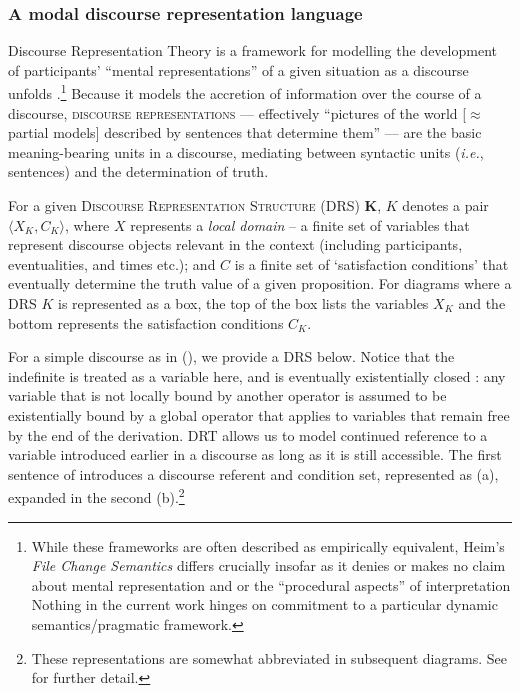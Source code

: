 \subsubsection{A modal discourse representation language}\label{sec-MDRL}

Discourse Representation Theory \citetext{originating simultaneously with \citealt{Kamp1981} and the related system of \citealt{Heim}} is a framework for modelling the development of participants' ``mental representations'' of a given situation as a discourse unfolds \citep[see][]{Geurts}.\footnote{While these frameworks are often described as empirically equivalent, Heim's \textit{File Change Semantics} differs crucially insofar as it denies or makes no claim about mental representation and or the ``procedural aspects'' of interpretation \citetext{\citealp[102]{Kamp1988}, this property also addressed in \citealp[\S~6]{Geurts}.} Nothing in the current work hinges on commitment to a particular dynamic semantics/pragmatic framework.} 
Because it models the accretion of information over the course of a discourse, \textsc{discourse representations} --- effectively ``pictures of the world [$ \approx $ partial models] described by sentences that determine them'' --- are the basic meaning-bearing units in a discourse, mediating between syntactic units (\textit{i.e.}, sentences) and the determination of truth.


For a given \textsc{Discourse Representation Structure} (DRS) $ \boldsymbol K $, $ K $ denotes a pair $ \langle X_K,C_K\rangle $, where $ X $ represents a \textit{local domain} -- a finite set of variables that represent discourse objects relevant in the context (including participants, eventualities, and times etc.); and $ C $ is a finite set of `satisfaction conditions' that eventually determine the truth value of a given proposition. For diagrams where a DRS $ K $ is represented as a box, the top of the box lists the variables $ X_K $ and the bottom represents the satisfaction conditions $ C_K $. 

For a simple discourse as in (\nextx), we provide a DRS below. Notice that the indefinite is treated as a variable here, and is eventually existentially closed \citep{Heim}: any variable that is not locally bound by another operator is assumed to be existentially bound by a global operator that applies to variables that remain free by the end of the derivation. DRT allows us to model continued reference to a variable introduced earlier in a discourse as long as it is still accessible. The first sentence of  introduces a discourse referent and condition set, represented as (a), expanded in the second (b).\footnote{These representations are somewhat abbreviated in subsequent diagrams. See \citet{Kamp1993} for further detail.}


